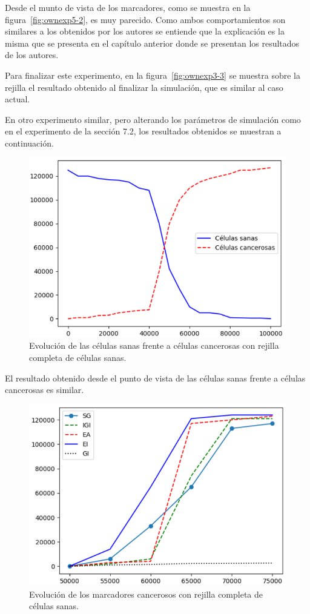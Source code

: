 Desde el munto de vista de los marcadores, como se muestra en la figura~\ref{fig:ownexp5-2}, es muy
parecido. Como ambos comportamientos son similares a los obtenidos por los autores se entiende
que la explicación es la misma que se presenta en el capítulo anterior donde
se presentan los resultados de los autores.

Para finalizar este experimento, en la figura~\ref{fig:ownexp3-3} se muestra sobre la rejilla el resultado
obtenido al finalizar la simulación, que es similar al caso actual.

En otro experimento similar, pero alterando los parámetros de simulación como en el experimento de la sección
7.2, los resultados obtenidos se muestran a continuación.

\begin{figure}[h]
\centering
\includegraphics[scale=0.8]{figures/experiments/exp6/healthvscarcino}
\caption{Evolución de las células sanas frente a células cancerosas con rejilla completa de células sanas.}
\label{fig:ownexp6-1}
\end{figure}

El resultado obtenido desde el punto de vista de las células sanas frente a células cancerosas
es similar.

\begin{figure}[h]
\centering
\includegraphics[scale=0.8]{figures/experiments/exp6/mutations}
\caption{Evolución de los marcadores cancerosos con rejilla completa de células sanas.}
\label{fig:ownexp6-2}
\end{figure}

